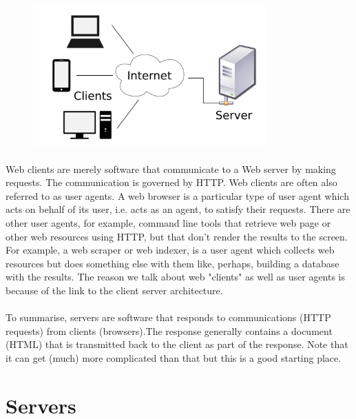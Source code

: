 \documentclass[12pt, a4paper, oneside]{book}
\begin{document}
\begin{figure}[H]
\centering
\includegraphics[width=0.8\textwidth]{figures/client-server-architecture.png}
\label{fig:client-server-architecture}
\end{figure}


\paragraph{} Web clients are merely software that communicate to a Web server by making requests. The communication is governed by HTTP. Web clients are often also referred to as user agents. A web browser is a particular type of user agent which acts on behalf of its user, i.e. acts as an agent, to satisfy their requests. There are other user agents, for example, command line tools that retrieve web page or other web resources using HTTP, but that don't render the results to the screen. For example, a web scraper or web indexer, is a user agent which collects web resources but does something else with them like, perhaps, building a database with the results. The reason we talk about web "clients" as well as user agents is because of the link to the client server architecture.
\paragraph{} To summarise, servers are software that responds to communications (HTTP requests) from clients (browsers).The response generally contains a document (HTML) that is transmitted back to the client as part of the response. Note that it can get (much) more complicated than that but this is a good starting place.


\section{Servers}
\end{document}
